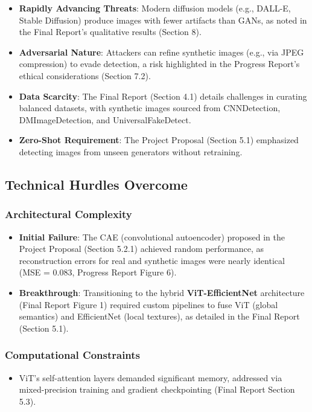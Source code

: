 \documentclass{article} %
\begin{document}
\begin{itemize}
    \item \textbf{Rapidly Advancing Threats}: Modern diffusion models (e.g., DALL-E, Stable Diffusion) produce images with fewer artifacts than GANs, as noted in the Final Report’s qualitative results (Section 8).  
    \item \textbf{Adversarial Nature}: Attackers can refine synthetic images (e.g., via JPEG compression) to evade detection, a risk highlighted in the Progress Report’s ethical considerations (Section 7.2).  
    \item \textbf{Data Scarcity}: The Final Report (Section 4.1) details challenges in curating balanced datasets, with synthetic images sourced from CNNDetection, DMImageDetection, and UniversalFakeDetect.  
    \item \textbf{Zero-Shot Requirement}: The Project Proposal (Section 5.1) emphasized detecting images from unseen generators without retraining.  
\end{itemize}

\subsection{Technical Hurdles Overcome}  
\subsubsection{Architectural Complexity}  
\begin{itemize}
    \item \textbf{Initial Failure}: The CAE (convolutional autoencoder) proposed in the Project Proposal (Section 5.2.1) achieved random performance, as reconstruction errors for real and synthetic images were nearly identical (MSE = 0.083, Progress Report Figure 6).  
    \item \textbf{Breakthrough}: Transitioning to the hybrid \textbf{ViT-EfficientNet} architecture (Final Report Figure 1) required custom pipelines to fuse ViT (global semantics) and EfficientNet (local textures), as detailed in the Final Report (Section 5.1).  
\end{itemize}

\subsubsection{Computational Constraints}  
\begin{itemize}
    \item ViT’s self-attention layers demanded significant memory, addressed via mixed-precision training and gradient checkpointing (Final Report Section 5.3).  
\end{itemize}
\end{document}
